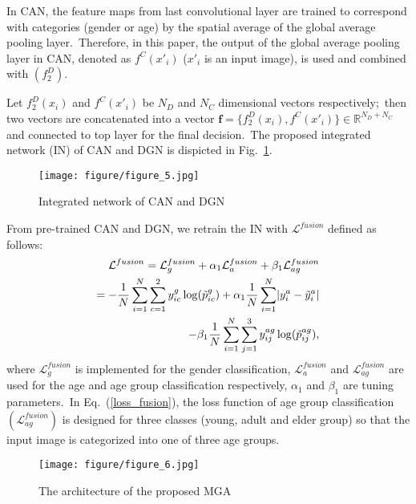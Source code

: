 \documentclass[10pt,twocolumn,letterpaper]{article}
\begin{document}
In CAN, the feature maps from last convolutional layer are trained to correspond with categories (gender or age) by the spatial average of the global average pooling layer.~Therefore, in this paper, the output of the global average pooling layer in CAN, denoted as $f^C(x'_i)$ ($x'_i$ is an input image), is used and combined with $(f_2^D)$.

Let $f_2^D(x_i)$ and $f^C(x'_i)$ be $N_D$ and $N_C$ dimensional vectors respectively;~then two vectors are concatenated into a vector $\boldsymbol{f}=\{f_2^D(x_i), f^C(x'_i)\}\in\mathbb{R}^{N_D+N_C}$ and connected to top layer for the final decision.~The proposed integrated network (IN) of CAN and DGN is dispicted in Fig.~\ref{fig:figure_5}. 

\begin{figure}[!h]
    \centering
    \texttt{[image: figure/figure\_5.jpg]}
    \caption{Integrated network of CAN and DGN}
    \label{fig:figure_5}
\end{figure}

From pre-trained CAN and DGN, we retrain the IN with $\mathcal{L}^{fusion}$ defined as follows: 
\begin{align}
\label{loss_fusion}
    \mathcal{L}^{fusion}=\mathcal{L}_g^{fusion}+\alpha_1\mathcal{L}_a^{fusion}+\beta_1\mathcal{L}_{ag}^{fusion}\nonumber\\
    =-\frac{1}{N}\sum_{i=1}^N\sum_{c=1}^2y_{ic}^g\log(\Tilde{p}_{ic}^g)+\alpha_1\frac{1}{N}\sum_{i=1}^N\lvert y_i^{a}-\Tilde{y}_i^a\rvert\nonumber\\-\beta_1\frac{1}{N}\sum_{i=1}^N\sum_{j=1}^3y_{ij}^{ag}\log(\Tilde{p}^{ag}_{ij}),
\end{align}
where $\mathcal{L}^{fusion}_g$ is implemented for the gender classification, $\mathcal{L}^{fusion}_a$ and $\mathcal{L}^{fusion}_{ag}$ are used for the age and age group classification respectively, $\alpha_1$ and $\beta_1$ are tuning parameters.~In Eq.~(\ref{loss_fusion}), the loss function of age group classification $(\mathcal{L}^{fusion}_{ag})$ is designed for three classes (young, adult and elder group) so that the input image is categorized into one of three age groups.

\begin{figure*}[!ht]
    \centering
    \texttt{[image: figure/figure\_6.jpg]}
    \caption{The architecture of the proposed MGA}
    \label{fig:figure_6}
\end{figure*}

\end{document}
